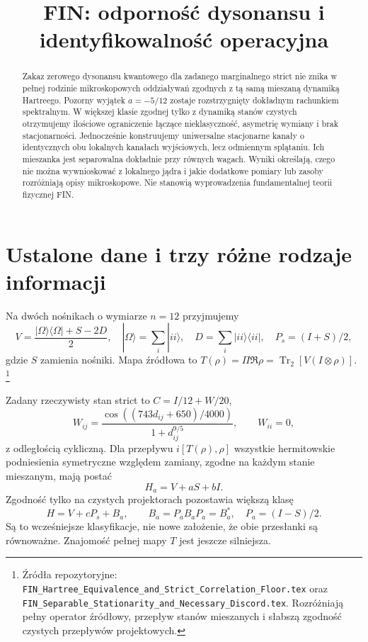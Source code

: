 \documentclass[11pt,a4paper]{article}
\title{FIN: odporność dysonansu i identyfikowalność operacyjna}
\author{}
\date{}
\newcommand{\Tr}{\operatorname{Tr}}
\begin{document}
\maketitle

\begin{abstract}
Zakaz zerowego dysonansu kwantowego dla zadanego marginalnego strict
nie znika w pełnej rodzinie mikroskopowych oddziaływań zgodnych z tą
samą mieszaną dynamiką Hartreego. Pozorny wyjątek $a=-5/12$ zostaje
rozstrzygnięty dokładnym rachunkiem spektralnym. W większej klasie
zgodnej tylko z dynamiką stanów czystych otrzymujemy ilościowe
ograniczenie łączące nieklasyczność, asymetrię wymiany i brak stacjonarności.
Jednocześnie konstruujemy uniwersalne stacjonarne kanały o identycznych
obu lokalnych kanałach wyjściowych, lecz odmiennym splątaniu.
Ich mieszanka jest separowalna dokładnie przy równych wagach.
Wyniki określają, czego nie można wywnioskować z lokalnego jądra
i jakie dodatkowe pomiary lub zasoby rozróżniają opisy mikroskopowe.
Nie stanowią wyprowadzenia fundamentalnej teorii fizycznej FIN.
\end{abstract}

\section{Ustalone dane i trzy różne rodzaje informacji}

Na dwóch nośnikach o wymiarze $n=12$ przyjmujemy
\[
 V=\frac{|\Omega\rangle\langle\Omega|+S-2D}{2},\quad
 |\Omega\rangle=\sum_i|ii\rangle,\quad
 D=\sum_i|ii\rangle\langle ii|,\quad P_s=(I+S)/2,
\]
gdzie $S$ zamienia nośniki. Mapa źródłowa to
$T(\rho)=\Pi\Re\rho=\Tr_2[V(I\otimes\rho)]$.
\footnote{Źródła repozytoryjne:
\texttt{FIN\_Hartree\_Equivalence\_and\_Strict\_Correlation\_Floor.tex}
oraz \texttt{FIN\_Separable\_Stationarity\_and\_Necessary\_Discord.tex}.
Rozróżniają pełny operator źródłowy, przepływ stanów mieszanych
i słabszą zgodność czystych przepływów projektowych.}

Zadany rzeczywisty stan strict to $C=I/12+W/20$,
\[
 W_{ij}=\frac{\cos((743d_{ij}+650)/4000)}{1+d_{ij}^{9/5}},\qquad W_{ii}=0,
\]
z odległością cykliczną. Dla przepływu $i[T(\rho),\rho]$ wszystkie
hermitowskie podniesienia symetryczne względem zamiany, zgodne na
każdym stanie mieszanym, mają postać
\begin{equation}\label{eq:mixed}
 H_a=V+aS+bI.
\end{equation}
Zgodność tylko na czystych projektorach pozostawia większą klasę
\begin{equation}\label{eq:pure}
 H=V+cP_s+B_a,\qquad B_a=P_aB_aP_a=B_a^*,\quad P_a=(I-S)/2.
\end{equation}
Są to wcześniejsze klasyfikacje, nie nowe założenie, że obie przesłanki
są równoważne. Znajomość pełnej mapy $T$ jest jeszcze silniejsza.
\end{document}
